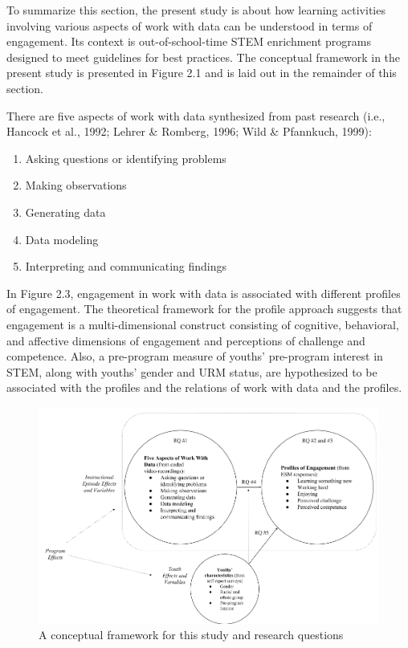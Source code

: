 \documentclass[]{book}
\providecommand{\tightlist}{%
  \setlength{\itemsep}{0pt}\setlength{\parskip}{0pt}}
\theoremstyle{definition}
\theoremstyle{definition}
\theoremstyle{definition}
\theoremstyle{remark}
\begin{document}
To summarize this section, the present study is about how learning
activities involving various aspects of work with data can be understood
in terms of engagement. Its context is out-of-school-time STEM
enrichment programs designed to meet guidelines for best practices. The
conceptual framework in the present study is presented in Figure 2.1 and
is laid out in the remainder of this section.

There are five aspects of work with data synthesized from past research
(i.e., Hancock et al., 1992; Lehrer \& Romberg, 1996; Wild \& Pfannkuch,
1999):

\begin{enumerate}
\def\labelenumi{\arabic{enumi}.}
\tightlist
\item
  Asking questions or identifying problems
\item
  Making observations
\item
  Generating data
\item
  Data modeling
\item
  Interpreting and communicating findings
\end{enumerate}

In Figure 2.3, engagement in work with data is associated with different
profiles of engagement. The theoretical framework for the profile
approach suggests that engagement is a multi-dimensional construct
consisting of cognitive, behavioral, and affective dimensions of
engagement and perceptions of challenge and competence. Also, a
pre-program measure of youths' pre-program interest in STEM, along with
youths' gender and URM status, are hypothesized to be associated with
the profiles and the relations of work with data and the profiles.

\begin{figure}

{\centering \includegraphics[width=0.8\linewidth]{images/figure2} 

}

\caption{A conceptual framework for this study and research questions}\label{fig:unnamed-chunk-1}
\end{figure}
\end{document}
